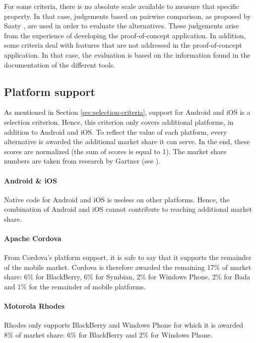 For some criteria, there is no absolute scale available to measure that specific property. In that case, judgements based on pairwise comparison, as proposed by Saaty \cite{Saaty:1980}, are used in order to evaluate the alternatives. These judgements arise from the experience of developing the proof-of-concept application. In addition, some criteria deal with features that are not addressed in the proof-of-concept application. In that case, the evaluation is based on the information found in the documentation of the different tools. 


\subsection{Platform support}

As mentioned in Section \ref{sec:selection-criteria}, support for Android and iOS is a selection criterion. Hence, this criterion only covers additional platforms, in addition to Android and iOS. To reflect the value of each platform, every alternative is awarded the additional market share it can serve. In the end, these scores are normalized (the sum of scores is equal to 1). The market share numbers are taken from research by Gartner \citeGartner (see ).

\paragraph{Android \& iOS} Native code for Android and iOS is useless on other platforms. Hence, the combination of Android and iOS cannot contribute to reaching additional market share.

\paragraph{Apache Cordova} From Cordova's platform support, it is safe to say that it supports the remainder of the mobile market. Cordova is therefore awarded the remaining 17\% of market share: 6\% for BlackBerry, 6\% for Symbian, 2\% for Windows Phone, 2\% for Bada and 1\% for the remainder of mobile platforms.

\paragraph{Motorola Rhodes} Rhodes only supports BlackBerry and Windows Phone for which it is awarded 8\% of market share: 6\% for BlackBerry and 2\% for Windows Phone. 

